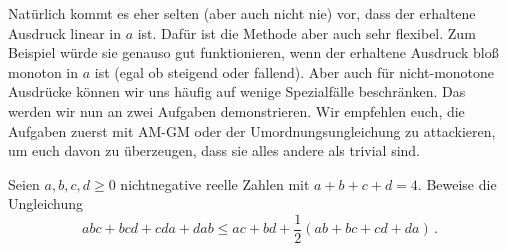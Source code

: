 Natürlich kommt es eher selten (aber auch nicht nie) vor, dass der erhaltene Ausdruck linear in $a$ ist. Dafür ist die Methode aber auch sehr flexibel. Zum Beispiel würde sie genauso gut funktionieren, wenn der erhaltene Ausdruck bloß monoton in $a$ ist (egal ob steigend oder fallend). Aber auch für nicht-monotone Ausdrücke können wir uns häufig auf wenige Spezialfälle beschränken. Das werden wir nun an zwei Aufgaben demonstrieren. Wir empfehlen euch, die Aufgaben zuerst mit AM-GM oder der Umordnungsungleichung zu attackieren, um euch davon zu überzeugen, dass sie alles andere als trivial sind.
\begin{aufgabe*}\label{aufgabe:JuMaUngleichung}
	Seien $a,b,c,d\geqslant 0$ nichtnegative reelle Zahlen mit $a+b+c+d=4$. Beweise die Ungleichung
	\begin{equation*}
		abc+bcd+cda+dab\leqslant ac+bd+\frac12(ab+bc+cd+da)\,.
	\end{equation*}
\end{aufgabe*}
